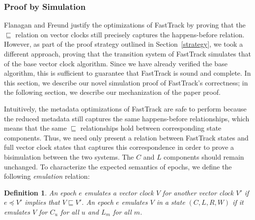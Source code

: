 \documentclass[preprint, 10pt]{sigplanconf}
\newtheorem{definition}{Definition}
\begin{document}
\subsubsection{Proof by Simulation}
Flanagan and Freund justify the optimizations of FastTrack by proving that the $\sqsubseteq$ relation on vector clocks still precisely captures the happens-before relation. However, as part of the proof strategy outlined in Section~\ref{strategy}, we took a different approach, proving that the transition system of FastTrack simulates that of the base vector clock algorithm. Since we have already verified the base algorithm, this is sufficient to guarantee that FastTrack is sound and complete. In this section, we describe our novel simulation proof of FastTrack's correctness; in the following section, we describe our mechanization of the paper proof.

Intuitively, the metadata optimizations of FastTrack are safe to perform because the reduced metadata still captures the same happens-before relationships, which means that the same $\sqsubseteq$ relationships hold between corresponding state components. Thus, we need only present a relation between FastTrack states and full vector clock states that captures this correspondence in order to prove a bisimulation between the two systems. The $C$ and $L$ components should remain unchanged. To characterize the expected semantics of epochs, we define the following \emph{emulation} relation:
\begin{definition}An epoch $e$ \emph{emulates} a vector clock $V$ for another vector clock $V'$ if $e \preceq V'$ implies that $V \sqsubseteq V'$. An epoch $e$ emulates $V$ in a state $(C, L, R, W)$ if it emulates $V$ for $C_u$ for all $u$ and $L_m$ for all $m$.\end{definition}
\end{document}
